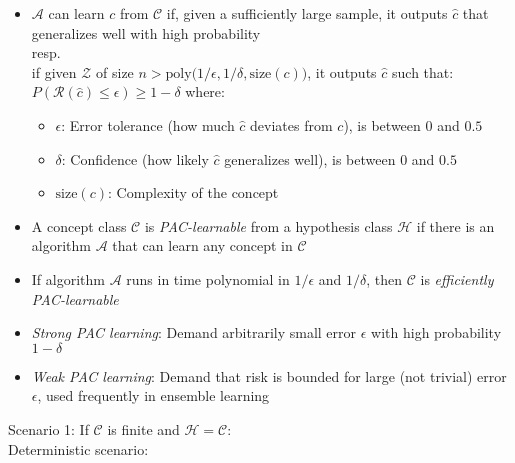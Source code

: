 \begin{itemize}
    \item $\mathcal{A}$ can learn $c$ from $\mathcal{C}$ if, given a sufficiently large sample, it outputs $\hat{c}$ that generalizes well with high probability\\
    resp.\\
    if given $\mathcal{Z}$ of size $n > \textrm{poly}\big(1/\epsilon, 1/\delta, \textrm{size}(c)\big)$, it outputs $\hat{c}$ such that:
    $
    P(\mathcal{R}(\hat{c}) \leq \epsilon) \geq 1 - \delta
    $
    where:
    \begin{itemize}
        \item $\epsilon$: Error tolerance (how much $\hat{c}$ deviates from $c$), is between $0$ and $0.5$
        \item $\delta$: Confidence (how likely $\hat{c}$ generalizes well), is between $0$ and $0.5$
        \item $\textrm{size}(c)$: Complexity of the concept
    \end{itemize}
    \item A concept class $\mathcal{C}$ is \emph{PAC-learnable} from a hypothesis class $\mathcal{H}$ if there is an algorithm $\mathcal{A}$ that can learn any concept in $\mathcal{C}$
    \item If algorithm $\mathcal{A}$ runs in time polynomial in $1/\epsilon$ and $1/\delta$, then $\mathcal{C}$ is \emph{efficiently PAC-learnable}
    \item \emph{Strong PAC learning}: Demand arbitrarily small error $\epsilon$ with high probability $1 - \delta$
    \item \emph{Weak PAC learning}: Demand that risk is bounded for large (not trivial) error $\epsilon$, used frequently in ensemble learning
\end{itemize}
Scenario 1: If $\mathcal{C}$ is finite and $\mathcal{H} = \mathcal{C}$:\\
Deterministic scenario:
